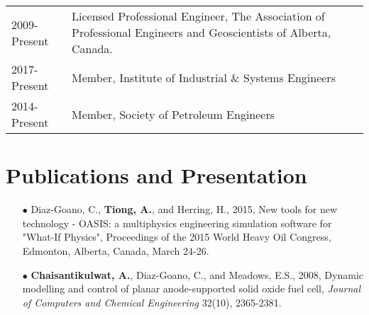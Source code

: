 \documentclass[10pt, letterpaper]{article}
\begin{document}
{{{	\begin{tabular}{p{0.75in} p{5.6in}}
		{\small 2009-Present} & Licensed Professional Engineer, The Association of Professional Engineers and Geoscientists of Alberta, Canada.\\ %
		{\small 2017-Present} & Member, Institute of Industrial \& Systems Engineers\\
		{\small 2014-Present} & Member, Society of Petroleum Engineers\\
	\end{tabular}



\vspace{8pt}
\section*{Publications and Presentation} %
\vspace{5pt}
\begin{itemize}
	
	\item[\tiny$\bullet$] Diaz-Goano, C., \textbf{Tiong, A.}, and Herring, H., 2015, New tools for new technology - OASIS: a multiphysics engineering simulation software for "What-If Physics", Proceedings of the 2015 World Heavy Oil Congress, Edmonton, Alberta, Canada, March 24-26.
	
	\item[\tiny$\bullet$] \textbf{Chaisantikulwat, A.}, Diaz-Goano, C., and Meadows, E.S., 2008, Dynamic modelling and control of planar anode-supported solid oxide fuel cell, {\it Journal of Computers and Chemical Engineering} 32(10), 2365-2381. %
	

\end{itemize}}}}
\end{document}
